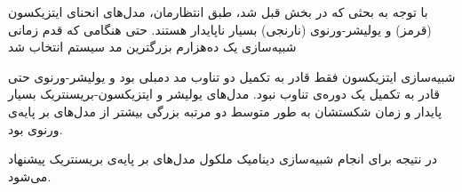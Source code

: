  با توجه به بحثی که در بخش قبل شد، طبق انتظارمان، مدل‌های انحنای ایتزیکسون (قرمز) و یولیشر-ورنوی (نارنجی) بسیار ناپایدار هستند. حتی هنگامی که قدم زمانی شبیه‌سازی یک ده‌هزارم بزرگترین مد سیستم انتخاب شد
 
شبیه‌سازی ایتزیکسون فقط قادر به تکمیل دو تناوب مد دمبلی بود و یولیشر-ورنوی حتی قادر به تکمیل یک دوره‌ی تناوب نبود. 
مد‌ل‌های یولیشر و ایتزیکسون-بریسنتریک بسیار پایدار و زمان شکستشان به طور متوسط دو مرتبه بزرگی بیشتر از مدل‌های بر پایه‌ی ورنوی بود. 

در نتیجه برای انجام شبیه‌سازی دینامیک ملکول مدل‌های بر پایه‌ی بریسنتریک پیشنهاد می‌شود. 








